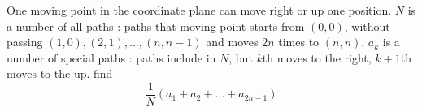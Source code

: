 One moving point in the coordinate plane can move right or up one position.
$N$ is a number of all paths : paths that moving point starts from $(0, 0)$, without passing $(1, 0), (2, 1), . . . , (n, n-1)$ and moves $2n$ times to $(n, n)$.
$a_k$ is a number of special paths : paths include in $N$, but $k$th moves to the right, $k+1$th moves to the up.
find $$\frac{1}{N} (a_1+a_2+ . . . + a_{2n-1})$$